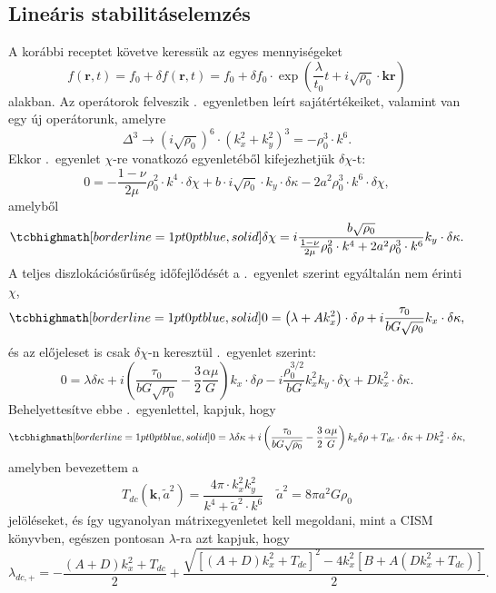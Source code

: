 \documentclass[10pt,a4paper]{scrartcl}
\let\mathbf\bm
\begin{document}
\subsection{Lineáris stabilitáselemzés}
A korábbi receptet követve keressük az egyes mennyiségeket
\[f\left( {{\mathbf{r}},t} \right) = {f_0} + \delta f\left( {{\mathbf{r}},t} \right) = {f_0} + \delta {f_0} \cdot \exp \left( {\frac{\lambda }{{{t_0}}}t + i\sqrt {{\rho _0}}  \cdot {\mathbf{kr}}} \right)\]
alakban. Az operátorok felveszik .\ egyenletben leírt sajátértékeiket, valamint van egy új operátorunk, amelyre
\[{\Delta ^3} \to {\left( {i\sqrt {{\rho _0}} } \right)^6} \cdot {\left( {k_x^2 + k_y^2} \right)^3} =  - \rho _0^3 \cdot {k^6}.\]
Ekkor .\ egyenlet $\chi$-re vonatkozó egyenletéből kifejezhetjük $\delta \chi$-t:
\[
  0  =  - \frac{{1 - \nu }}{{2\mu }}\rho _0^2 \cdot {k^4} \cdot \delta \chi  + b \cdot i\sqrt {{\rho _0}}  \cdot {k_y} \cdot \delta \kappa  - 2{a^2}\rho _0^3 \cdot {k^6} \cdot \delta \chi,\]
amelyből 
\begin{equation} \label{eq:lin_ed_chi_dc}
\tcbhighmath[borderline={1pt}{0pt}{blue,solid}]{
\delta \chi  = i\frac{{b\sqrt {{\rho _0}} }}{{\frac{{1 - \nu }}{{2\mu }}\rho _0^2 \cdot {k^4} + 2{a^2}\rho _0^3 \cdot {k^6}}}{k_y} \cdot \delta \kappa.}
\end{equation}
A teljes diszlokációsűrűség időfejlődését a .\ egyenlet szerint egyáltalán nem érinti $\chi$,
\begin{equation*}
\tcbhighmath[borderline={1pt}{0pt}{blue,solid}]{
0 = \left( {\lambda  + Ak_x^2} \right) \cdot \delta \rho  + i\frac{{{\tau _0}}}{{bG\sqrt {{\rho _0}} }}{k_x} \cdot \delta \kappa, }
\end{equation*}
és az előjeleset is csak $\delta \chi$-n keresztül .\ egyenlet szerint:
\[0 = \lambda \delta \kappa  + i\left( {\frac{{{\tau _0}}}{{bG\sqrt {{\rho _0}} }} - \frac{3}{2}\frac{{\alpha \mu }}{G}} \right){k_x} \cdot \delta \rho  - i\frac{{\rho _0^{3/2}}}{{bG}}k_x^2{k_y} \cdot \delta \chi  + Dk_x^2 \cdot \delta \kappa .\]
Behelyettesítve ebbe .\ egyenlettel, kapjuk, hogy 
\begin{equation} \label{eq:lin_ed_kappa_dc}
\tcbhighmath[borderline={1pt}{0pt}{blue,solid}]{
0 = \lambda \delta \kappa  + i\left( {\frac{{{\tau _0}}}{{bG\sqrt {{\rho _0}} }} - \frac{3}{2}\frac{{\alpha \mu }}{G}} \right){k_x}\delta \rho  + {T_{dc}} \cdot \delta \kappa  + Dk_x^2 \cdot \delta \kappa,}
\end{equation}
amelyben bevezettem a 
\[{T_{dc}}\left( {\mathbf{k}},{\tilde a}^2 \right) = \frac{{4\pi  \cdot k_x^2k_y^2}}{{{k^4} + {{\tilde a}^2} \cdot {k^6}}}\quad {{\tilde a}^2} = 8\pi {a^2}G{\rho _0}\]
jelöléseket, és így ugyanolyan mátrixegyenletet kell megoldani, mint a CISM könyvben, egészen pontosan $\lambda$-ra azt kapjuk, hogy 
\[{\lambda _{dc, + }} =  - \frac{{\left( {A + D} \right)k_x^2 + {T_{dc}}}}{2} + \frac{{\sqrt {{{\left[ {\left( {A + D} \right)k_x^2 + {T_{dc}}} \right]}^2} - 4k_x^2\left[ {B + A\left( {Dk_x^2 + {T_{dc}}} \right)} \right]} }}{2}.\]
\end{document}
